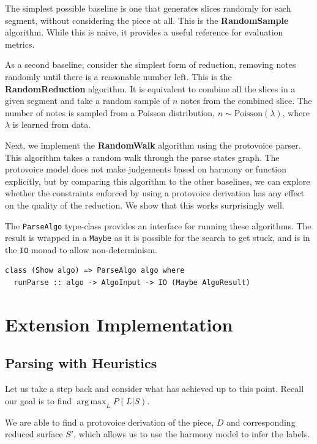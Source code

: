 \documentclass[12pt,a4paper,twoside,openright]{report}
\DeclareMathOperator*{\argmax}{arg\,max}
\theoremstyle{definition}
\begin{document}
The simplest possible baseline is one that generates slices randomly for each segment, without considering the piece at all. This is the \textbf{RandomSample} algorithm. While this is naive, it provides a useful reference for evaluation metrics.

As a second baseline, consider the simplest form of reduction, removing notes randomly until there is a reasonable number left. This is the \textbf{RandomReduction} algorithm.
It is equivalent to combine all the slices in a given segment and take a random sample of $n$ notes from the combined slice. 
The number of notes is sampled from a Poisson distribution, $n \sim \text{Poisson}(\lambda)$, where $\lambda$ is learned from data. 

Next, we implement the \textbf{RandomWalk} algorithm using the protovoice parser. This algorithm takes a random walk through the parse states graph. The protovoice model does not make judgements based on harmony or function explicitly, but by comparing this algorithm to the other baselines, we can explore whether the constraints enforced by using a protovoice derivation has any effect on the quality of the reduction. We show that this works surprisingly well.

The \texttt{ParseAlgo} type-class provides an interface for running these algorithms. The result is wrapped in a \texttt{Maybe} as it is possible for the search to get stuck, and is in the \texttt{IO} monad to allow non-determinism.

\begin{lstlisting}[caption={Algorithm type-class}, captionpos=b]
class (Show algo) => ParseAlgo algo where 
  runParse :: algo -> AlgoInput -> IO (Maybe AlgoResult)
\end{lstlisting}

\section{Extension Implementation}

\subsection{Parsing with Heuristics}
Let us take a step back and consider what has achieved up to this point. Recall our goal is to find $\argmax_L P(L|S)$. 

We are able to find a protovoice derivation of the piece, $D$ and corresponding reduced surface $S'$, which allows us to use the harmony model to infer the labels. 
\end{document}
